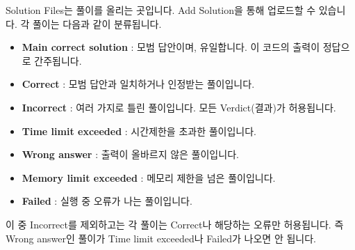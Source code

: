 \documentclass{article}
\begin{document}
    Solution Files는 풀이를 올리는 곳입니다. Add Solution을 통해 업로드할 수 있습니다. 각 풀이는 다음과 같이 분류됩니다.
    \begin{itemize}
        \item \textbf{Main correct solution} : 모범 답안이며, 유일합니다. 이 코드의 출력이 정답으로 간주됩니다.
        \item \textbf{Correct} : 모범 답안과 일치하거나 인정받는 풀이입니다.
        \item \textbf{Incorrect} : 여러 가지로 틀린 풀이입니다. 모든 Verdict(결과)가 허용됩니다.
        \item \textbf{Time limit exceeded} : 시간제한을 초과한 풀이입니다.
        \item \textbf{Wrong answer} : 출력이 올바르지 않은 풀이입니다.
        \item \textbf{Memory limit exceeded} : 메모리 제한을 넘은 풀이입니다.
        \item \textbf{Failed} : 실행 중 오류가 나는 풀이입니다.
    \end{itemize}
    이 중 Incorrect를 제외하고는 각 풀이는 Correct나 해당하는 오류만 허용됩니다. 즉 Wrong answer인 풀이가 Time limit exceeded나 Failed가 나오면 안 됩니다.
\end{document}
